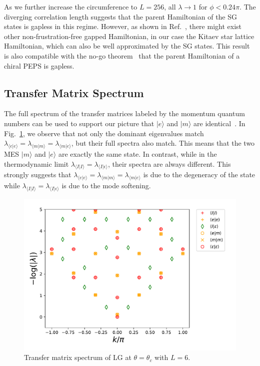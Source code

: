 \documentclass{ntuthesis}
\newcommand{\citep}{\cite}
\begin{document}
As we further increase the circumference to $L = 256$, all $\lambda \rightarrow 1$ for $\phi < 0.24\pi$. 
%
The diverging correlation length suggests that the parent Hamiltonian of the SG states is gapless in this regime.
%
However, as shown in Ref.~\cite{2013_PEPS_chiral_TO}, there might exist other non-frustration-free gapped Hamiltonian, in our case the Kitaev star lattice Hamiltonian, which can also be well approximated by the SG states. 
%
This result is also compatible with  the no-go theorem~\cite{2015_no_go_theorem} that the parent Hamiltonian of  a chiral PEPS is gapless. 
%





\subsection{Transfer Matrix Spectrum}

The full spectrum of the transfer matrices labeled by the momentum quantum numbers can be used to support our picture that $|e\rangle$ and $|m\rangle$ are identical~\citep{Haegeman_2015}. 
%
In Fig.~\ref{LG_thetaC_L6_NA}, we observe that not only the dominant eigenvalues match $\lambda_{\langle e|e\rangle} = \lambda_{\langle m|m\rangle} = \lambda_{\langle m|e\rangle}$, but their full spectra also match. 
%
This means that the two MES $|m\rangle$ and $|e\rangle$ are exactly the same state. 
%
In contrast, while in the thermodynamic limit $\lambda_{\langle I|I\rangle}  = \lambda_{\langle I|\epsilon\rangle} $, their spectra are always different. 
%
This strongly suggests that $\lambda_{\langle e|e\rangle} = \lambda_{\langle m|m\rangle} = \lambda_{\langle m|e\rangle}$ is due to the degeneracy of the state while  $\lambda_{\langle I|I\rangle}  = \lambda_{\langle I|\epsilon\rangle} $ is due to the mode softening.

\begin{figure}[tb]
\centering
\includegraphics[width=\linewidth]{LG_thetaC_L6_NA}
\caption{ Transfer matrix spectrum of LG at $\theta = \theta_c$ with $L = 6$.} 
\label{LG_thetaC_L6_NA}
\end{figure}
\end{document}
